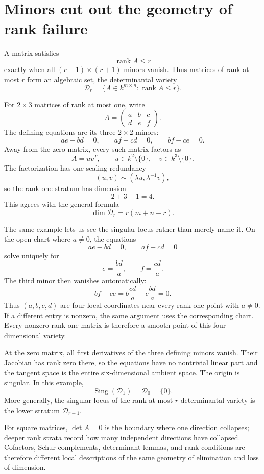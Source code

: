 \section{Minors cut out the geometry of rank failure}

A matrix satisfies
\[
  \operatorname{rank}A\le r
\]
exactly when all \((r+1)\times(r+1)\) minors vanish.  Thus matrices of rank at most \(r\) form an algebraic set, the determinantal variety
\[
  \mathcal D_r
  =\{A\in k^{m\times n}:\operatorname{rank}A\le r\}.
\]

For \(2\times3\) matrices of rank at most one, write
\[
  A=
  \begin{pmatrix}
    a&b&c\\
    d&e&f
  \end{pmatrix}.
\]
The defining equations are its three \(2\times2\) minors:
\[
  ae-bd=0,
  \qquad
  af-cd=0,
  \qquad
  bf-ce=0.
\]
Away from the zero matrix, every such matrix factors as
\[
  A=uv^T,
  \qquad
  u\in k^2\setminus\{0\},
  \quad
  v\in k^3\setminus\{0\}.
\]
The factorization has one scaling redundancy
\[
  (u,v)\sim(\lambda u,\lambda^{-1}v),
\]
so the rank-one stratum has dimension
\[
  2+3-1=4.
\]
This agrees with the general formula
\[
  \dim\mathcal D_r=r(m+n-r).
\]

The same example lets us see the singular locus rather than merely name it.  On the open chart where \(a\ne0\), the equations
\[
  ae-bd=0,
  \qquad
  af-cd=0
\]
solve uniquely for
\[
  e=\frac{bd}{a},
  \qquad
  f=\frac{cd}{a}.
\]
The third minor then vanishes automatically:
\[
  bf-ce
  =b\frac{cd}{a}-c\frac{bd}{a}=0.
\]
Thus \((a,b,c,d)\) are four local coordinates near every rank-one point with \(a\ne0\).  If a different entry is nonzero, the same argument uses the corresponding chart.  Every nonzero rank-one matrix is therefore a smooth point of this four-dimensional variety.

At the zero matrix, all first derivatives of the three defining minors vanish.  Their Jacobian has rank zero there, so the equations have no nontrivial linear part and the tangent space is the entire six-dimensional ambient space.  The origin is singular.  In this example,
\[
  \operatorname{Sing}(\mathcal D_1)=\mathcal D_0=\{0\}.
\]
More generally, the singular locus of the rank-at-most-\(r\) determinantal variety is the lower stratum \(\mathcal D_{r-1}\).

For square matrices, \(\det A=0\) is the boundary where one direction collapses; deeper rank strata record how many independent directions have collapsed.  Cofactors, Schur complements, determinant lemmas, and rank conditions are therefore different local descriptions of the same geometry of elimination and loss of dimension.